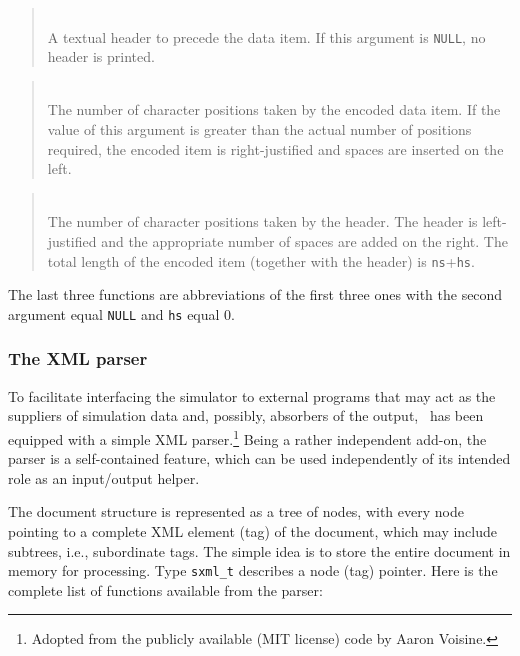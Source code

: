\begin{quote}
\noindent{}\\ \hspace{0in}
A textual header to precede the data item.
If this argument is {\tt NULL}, no header is printed.
\end{quote}

\begin{quote}
\noindent{}\\ \hspace{0in}
The number of character positions taken by the encoded data item.
If the value of this argument is greater than the actual number of positions
required, the encoded item is right-justified and spaces are inserted on the
left.
\end{quote}

\begin{quote}
\noindent{}\\ \hspace{0in}
The number of character positions taken by the header.
The header is left-justified and the appropriate number of spaces are added
on the right.
The total length of the encoded item (together with the header) is
{\tt ns}+{\tt hs}.
\end{quote}\medskip

The last three functions are abbreviations of the first three ones with
the second argument equal {\tt NULL} and {\tt hs} equal 0.

\subsubsection{The XML parser}
\label{rm_au_io_xm}

To facilitate interfacing the simulator to external programs that may act as
the suppliers of simulation data and, possibly, absorbers of the output, 
\smurph\ has been equipped with a simple XML
parser.\footnote{Adopted from the publicly available (MIT license)
code by Aaron Voisine.}
Being a rather independent add-on,
the parser is a self-contained feature, which can be used
independently of its intended role as an input/output helper.

The document structure is represented as a tree of nodes, with every node
pointing to a complete XML element (tag)
of the document, which may include subtrees,
i.e., subordinate tags.
The simple idea is to store the entire document in memory for processing.
Type {\tt sxml\_t} describes a node (tag) pointer.
Here is the complete list of functions available from the parser:


